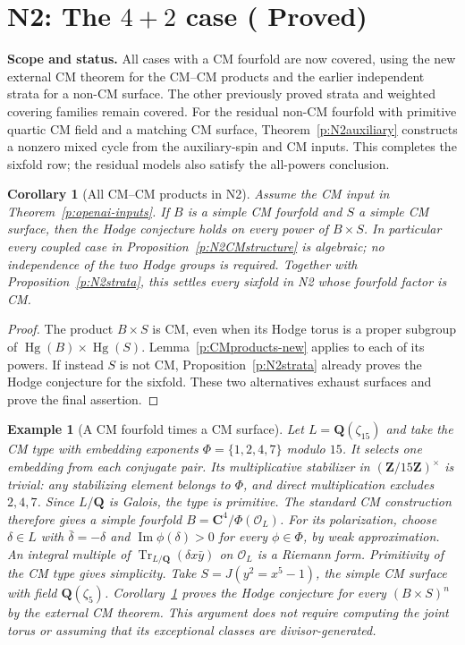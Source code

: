 \documentclass[10pt,reqno]{article}
\theoremstyle{emphasizedplain}
\DeclareRobustCommand{\provedstatus}{%
  \texorpdfstring{\textcolor{ProvedGreen}{\textbf{Proved}}}{Proved}}
\newtheorem{corollary}[theorem]{Corollary}
\theoremstyle{emphasizeddefinition}
\newtheorem{example}[theorem]{Example}
\theoremstyle{emphasizeddefinition}
\DeclareMathOperator{\Hg}{Hg}
\DeclareMathOperator{\Tr}{Tr}
\newcommand{\Q}{\mathbf Q}
\newcommand{\C}{\mathbf C}
\newcommand{\Z}{\mathbf Z}
\newcommand{\status}[1]{%
  \par\nobreak\smallskip\noindent
  {\setlength{\fboxsep}{7pt}%
   \colorbox{ScopeBackground}{%
    \parbox{\dimexpr\linewidth-2\fboxsep\relax}{%
     \small\textbf{\textcolor{HeadingInk}{Scope and status.}} #1}}}%
  \par\nobreak\medskip}
\renewcommand{\small}{\fontsize{8.4}{10}\selectfont}
\begin{document}
\section{N2: The \texorpdfstring{$4+2$}{4+2} case (\provedstatus)}\label{sec:N2}

\status{All cases with a CM fourfold are now covered, using the new
external CM theorem for the CM--CM products and the earlier independent
strata for a non-CM surface. The other previously proved strata and
weighted covering families remain covered. For the residual non-CM
fourfold with primitive quartic CM field and a matching CM surface,
Theorem~\ref{p:N2auxiliary} constructs a nonzero mixed cycle from
the auxiliary-spin and CM inputs. This completes the sixfold row;
the residual models also satisfy the all-powers conclusion.}

\begin{corollary}[All CM--CM products in N2]\label{p:N2CM-new}
Assume the CM input in Theorem~\ref{p:openai-inputs}.
If $B$ is a simple CM fourfold and $S$ a simple CM surface, then
the Hodge conjecture holds on every power of $B\times S$.
In particular every coupled case in Proposition~\ref{p:N2CMstructure}
is algebraic; no independence of the two Hodge groups is required.
Together with Proposition~\ref{p:N2strata}, this settles every
sixfold in N2 whose fourfold factor is CM.
\end{corollary}
\begin{proof}
The product $B\times S$ is CM, even when its Hodge torus is a proper
subgroup of $\Hg(B)\times\Hg(S)$.
Lemma~\ref{p:CMproducts-new} applies to each of its powers.
If instead $S$ is not CM, Proposition~\ref{p:N2strata} already
proves the Hodge conjecture for the sixfold. These two alternatives
exhaust surfaces and prove the final assertion.
\end{proof}
\begin{example}[A CM fourfold times a CM surface]\label{ex:N2CM-new}
Let $L=\Q(\zeta_{15})$ and take the CM type with embedding
exponents $\Phi=\{1,2,4,7\}$ modulo $15$.
It selects one embedding from each conjugate pair.
Its multiplicative stabilizer in $(\Z/15\Z)^\times$ is trivial:
any stabilizing element belongs to $\Phi$, and direct multiplication
excludes $2,4,7$. Since $L/\Q$ is Galois, the type is primitive.
The standard CM construction therefore gives a simple fourfold
$B=\C^4/\Phi(\mathcal O_L)$.
For its polarization, choose $\delta\in L$ with
$\bar\delta=-\delta$ and $\operatorname{Im}\phi(\delta)>0$
for every $\phi\in\Phi$, by weak approximation.
An integral multiple of $\Tr_{L/\Q}(\delta x\bar y)$ on
$\mathcal O_L$ is a Riemann form. Primitivity of the CM type
gives simplicity.
Take $S=J(y^2=x^5-1)$, the simple CM surface with field
$\Q(\zeta_5)$. Corollary~\ref{p:N2CM-new} proves the Hodge
conjecture for every $(B\times S)^n$ by the external CM theorem.
This argument does not require computing the joint torus or assuming
that its exceptional classes are divisor-generated.
\end{example}
\end{document}
